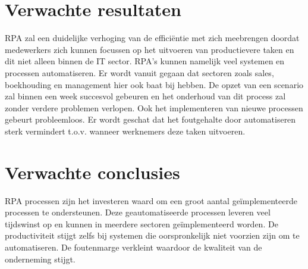 \section{Verwachte resultaten}
\label{sec:verwachte_resultaten}
RPA zal een duidelijke verhoging van de efficiëntie met zich meebrengen doordat medewerkers zich kunnen focussen op het uitvoeren van productievere taken en dit niet alleen binnen de IT sector. RPA's kunnen namelijk veel systemen en processen automatiseren. Er wordt vanuit gegaan dat sectoren zoals sales, boekhouding en management hier ook baat bij hebben. De opzet van een scenario zal binnen een week succesvol gebeuren en het onderhoud van dit process zal zonder verdere problemen verlopen. Ook het implementeren van nieuwe processen gebeurt probleemloos. Er wordt geschat dat het foutgehalte door automatiseren sterk vermindert t.o.v. wanneer werknemers deze taken uitvoeren.

\section{Verwachte conclusies}
\label{sec:verwachte_conclusies}
RPA processen zijn het investeren waard om een groot aantal geïmplementeerde processen te ondersteunen. Deze geautomatiseerde processen leveren veel tijdswinst op en kunnen in meerdere sectoren geïmplementeerd worden. De productiviteit stijgt zelfs bij systemen die oorspronkelijk niet voorzien zijn om te automatiseren.  De foutenmarge verkleint waardoor de kwaliteit van de onderneming stijgt.

